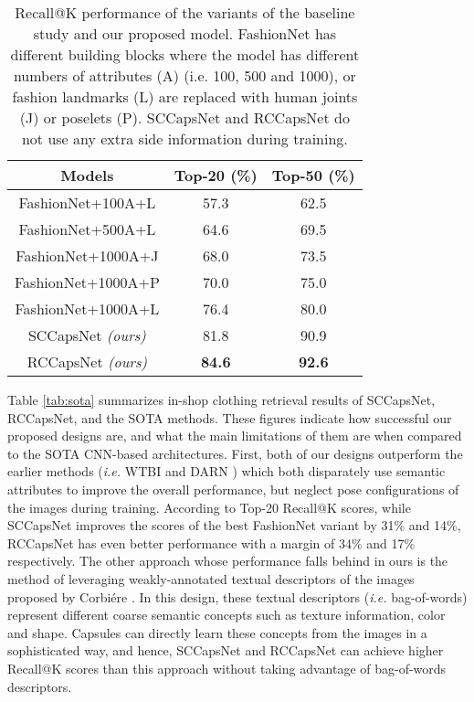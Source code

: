 \documentclass[10pt,twocolumn,letterpaper]{article}
\begin{document}
\begin{table}[t]
    \caption{Recall@K performance of the variants of
    the baseline study \cite{deepfashion} and our proposed model.
    FashionNet has different building blocks where the model
    has different numbers of attributes (A) (i.e. 100, 500 and
    1000), or fashion landmarks (L) are replaced with human
    joints (J) or poselets (P). SCCapsNet and RCCapsNet do not use
    any extra side information during training.}
    \begin{center}
        \begin{tabular}{c|c|c}
             \hline \hline
            \textbf{Models} & \textbf{Top-20 (\%)} & \textbf{Top-50 (\%)}  \\
            \hline \hline
            FashionNet+100A+L   &  57.3 &    62.5   \\
            FashionNet+500A+L   &  64.6 &    69.5   \\ 
            FashionNet+1000A+J  &  68.0 &    73.5   \\ 
            FashionNet+1000A+P  &  70.0 &    75.0   \\ 
            FashionNet+1000A+L  &  76.4 &    80.0   \\ \hline 
            SCCapsNet \textit{(ours)}         &  81.8 &    90.9   \\ 
            RCCapsNet \textit{(ours)}         &  \textbf{84.6} &    \textbf{92.6}   \\ \hline
            \hline
        \end{tabular}
    \end{center}
    \label{tab:baseline}
\end{table}

Table \ref{tab:sota} summarizes in-shop clothing retrieval results of SCCapsNet, RCCapsNet, and the SOTA methods. These figures indicate how successful our proposed designs are, and what the main limitations of them are when compared to the SOTA CNN-based architectures. First, both of our designs outperform the earlier methods (\textit{i.e.} WTBI \cite{wtbi} and DARN \cite{darn}) which both disparately use semantic attributes to improve the overall performance, but neglect pose configurations of the images during training. According to Top-20 Recall@K scores, while SCCapsNet improves the scores of the best FashionNet variant by 31\% and 14\%, RCCapsNet has even better performance with a margin of 34\% and 17\% respectively. The other approach whose performance falls behind in ours is the method of leveraging weakly-annotated textual descriptors of the images proposed by Corbi\'ere \etal \cite{weakly-anno}. In this design, these textual descriptors (\textit{i.e.} bag-of-words) represent different coarse semantic concepts such as texture information, color and shape. Capsules can directly learn these concepts from the images in a sophisticated way, and hence, SCCapsNet and RCCapsNet can achieve higher Recall@K scores than this approach without taking advantage of bag-of-words descriptors.
\end{document}
